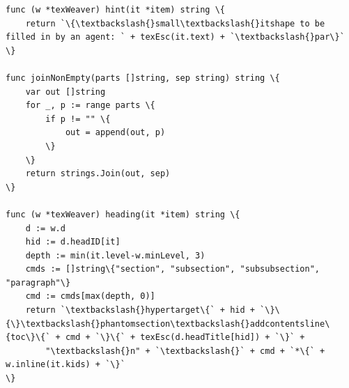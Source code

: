 \documentclass[10pt,a4paper]{article}
\begin{document}
\begin{Verbatim}
func (w *texWeaver) hint(it *item) string \{
	return `\{\textbackslash{}small\textbackslash{}itshape to be filled in by an agent: ` + texEsc(it.text) + `\textbackslash{}par\}`
\}

func joinNonEmpty(parts []string, sep string) string \{
	var out []string
	for _, p := range parts \{
		if p != "" \{
			out = append(out, p)
		\}
	\}
	return strings.Join(out, sep)
\}

func (w *texWeaver) heading(it *item) string \{
	d := w.d
	hid := d.headID[it]
	depth := min(it.level-w.minLevel, 3)
	cmds := []string\{"section", "subsection", "subsubsection", "paragraph"\}
	cmd := cmds[max(depth, 0)]
	return `\textbackslash{}hypertarget\{` + hid + `\}\{\}\textbackslash{}phantomsection\textbackslash{}addcontentsline\{toc\}\{` + cmd + `\}\{` + texEsc(d.headTitle[hid]) + `\}` +
		"\textbackslash{}n" + `\textbackslash{}` + cmd + `*\{` + w.inline(it.kids) + `\}`
\}
\end{Verbatim}
\end{document}
